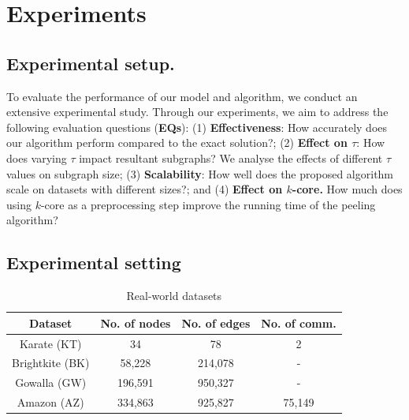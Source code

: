 \documentclass[sigconf]{acmart}
\newcommand{\KT}{\textsf{KT}}
\newcommand{\BRK}{\textsf{BK}}
\newcommand{\GW}{\textsf{GW}}
\newcommand{\DB}{\textsf{DB}}
\newcommand{\AZ}{\textsf{AZ}}
\newcommand{\PB}{\textsf{PB}}
\begin{document}
\section{Experiments}

\subsection{Experimental setup.}
To evaluate the performance of our model and algorithm, we conduct an extensive experimental study. Through our experiments, we aim to address the following evaluation questions (\textbf{EQs}): (1) \textbf{ Effectiveness}: How accurately does our algorithm perform compared to the exact solution?; (2) \textbf{Effect on $\tau$}: How does varying $\tau$ impact resultant subgraphs? We  analyse the effects of different $\tau$ values on subgraph size; (3)  \textbf{Scalability}: How well does the proposed algorithm scale on datasets with different sizes?; and (4) \textbf{Effect on $k$-core.} How much does using $k$-core as a preprocessing step improve the running time of the peeling algorithm? 





\subsection{Experimental setting}
\begin{table}[t]
\small
\caption{Real-world datasets}
\vspace{-0.3cm}
\begin{tabular}{c||c|c|c}
\hline
\textbf{Dataset}    & \textbf{No. of nodes} & \textbf{No. of edges} & \textbf{No. of comm.} \\ \hline\hline
Karate (\KT)       & 34              &  78         & 2       \\ \hline \hline
Brightkite (\BRK)  & 58,228          & 214,078     & -      \\ \hline  
Gowalla (\GW)      & 196,591         & 950,327     & -       \\ \hline
Amazon (\AZ)       & 334,863         & 925,827     & 75,149  \\ \hline \hline
\end{tabular}
\label{tab:dataset}
\vspace{-0.3cm}
\end{table}
\end{document}
